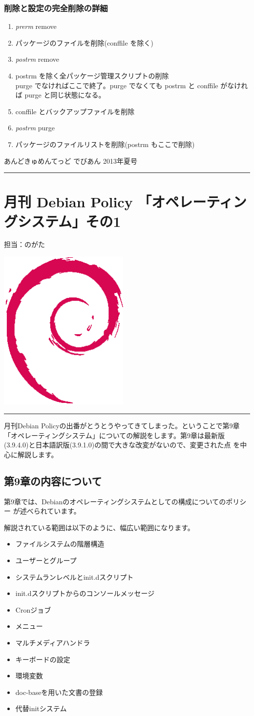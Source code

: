 \documentclass[mingoth,a4paper]{jsarticle}
\renewcommand{\dancersection}[2]{%
\newpage
あんどきゅめんてっど でびあん 2013年夏号
%
\vspace{0.1mm}\\
{\color{dancerdarkblue}\rule{\hsize}{2mm}}

%
%
\begin{minipage}[t]{0.6\hsize}
\color{dancerdarkblue}
\vspace{1cm}
\section{#1}
\hfill{}#2\\
\end{minipage}
\begin{minipage}[t]{0.4\hsize}
\vspace{-2cm}
\hfill{}\includegraphics[height=8cm]{image200502/openlogo-nd.eps}\\
\vspace{-5cm}
\end{minipage}
%
{\color{dancerlightblue}\rule{0.66\hsize}{2mm}}
%
\vspace{2cm}
}
\begin{document}
\subsubsection{削除と設定の完全削除の詳細}
\begin{enumerate}
\item {\it prerm} remove

\item パッケージのファイルを削除(conffile を除く)

\item {\it postrm} remove

\item postrm を除く全パッケージ管理スクリプトの削除\\
  purge でなければここで終了。purge でなくても postrm と conffile がなければ purge と同じ状態になる。

\item conffile とバックアップファイルを削除

\item {\it postrm} purge

\item パッケージのファイルリストを削除(postrm もここで削除)

\end{enumerate}

\dancersection{月刊 Debian Policy 「オペレーティングシステム」その1}{担当：のがた}

月刊Debian Policyの出番がとうとうやってきてしまった。ということで第9章
「オペレーティングシステム」についての解説をします。第9章は最新版
(3.9.4.0)と日本語訳版(3.9.1.0)の間で大きな改変がないので、変更された点
を中心に解説します。

\subsection{第9章の内容について}

第9章では、Debianのオペレーティングシステムとしての構成についてのポリシー
が述べられています。

解説されている範囲は以下のように、幅広い範囲になります。

\begin{itemize}
\item
  ファイルシステムの階層構造
\item
  ユーザーとグループ
\item
  システムランレベルとinit.dスクリプト
\item
  init.dスクリプトからのコンソールメッセージ
\item
  Cronジョブ
\item
  メニュー
\item
  マルチメディアハンドラ
\item
  キーボードの設定
\item
  環境変数
\item
  doc-baseを用いた文書の登録
\item
  代替initシステム
\end{itemize}
\end{document}
